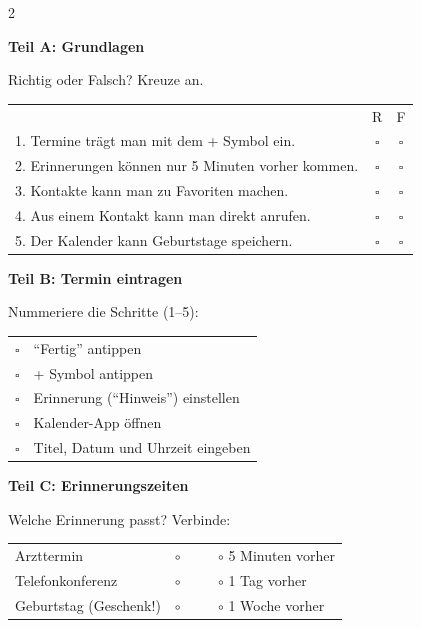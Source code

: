 \documentclass[a4paper,landscape,8pt]{extarticle}
\begin{document}
\begin{multicols}{2}

\textbf{\large Teil A: Grundlagen}

Richtig oder Falsch? Kreuze an.

\vspace{2mm}

\renewcommand{\arraystretch}{1.6}
\begin{tabular}{@{}p{8cm}cc@{}}
& R & F \\
1. Termine trägt man mit dem + Symbol ein. & $\square$ & $\square$ \\
2. Erinnerungen können nur 5 Minuten vorher kommen. & $\square$ & $\square$ \\
3. Kontakte kann man zu Favoriten machen. & $\square$ & $\square$ \\
4. Aus einem Kontakt kann man direkt anrufen. & $\square$ & $\square$ \\
5. Der Kalender kann Geburtstage speichern. & $\square$ & $\square$ \\
\end{tabular}
\renewcommand{\arraystretch}{1}

\vspace{6mm}

\textbf{\large Teil B: Termin eintragen}

Nummeriere die Schritte (1--5):

\vspace{2mm}

\renewcommand{\arraystretch}{1.8}
\begin{tabular}{@{}cp{7cm}@{}}
$\square$ & ``Fertig'' antippen \\
$\square$ & + Symbol antippen \\
$\square$ & Erinnerung (``Hinweis'') einstellen \\
$\square$ & Kalender-App öffnen \\
$\square$ & Titel, Datum und Uhrzeit eingeben \\
\end{tabular}
\renewcommand{\arraystretch}{1}

\vspace{6mm}

\textbf{\large Teil C: Erinnerungszeiten}

Welche Erinnerung passt? Verbinde:

\vspace{2mm}

\renewcommand{\arraystretch}{1.8}
\begin{tabular}{@{}p{4cm}p{4cm}@{}}
Arzttermin & $\circ$ ~~~~ $\circ$ 5 Minuten vorher \\
Telefonkonferenz & $\circ$ ~~~~ $\circ$ 1 Tag vorher \\
Geburtstag (Geschenk!) & $\circ$ ~~~~ $\circ$ 1 Woche vorher \\
\end{tabular}
\renewcommand{\arraystretch}{1}


\end{multicols}
\end{document}
